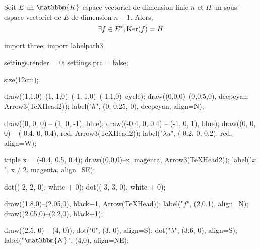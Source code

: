 \begin{prop}
	Soit $E$ un $\mathbbm{K}$-espace vectoriel de dimension finie $n$ et $H$ un sous-espace vectoriel de $E$ de dimension $n-1$. Alors, \[
		\exists f \in E^*, \operatorname{Ker}(f) = H
	\]

	\begin{center}
		\begin{asy}
			import three;
			import labelpath3;

			settings.render = 0;
			settings.prc = false;

			size(12cm);

			draw((1,1,0)--(1,-1,0)--(-1,-1,0)--(-1,1,0)--cycle);
			draw((0,0,0)--(0,0.5,0), deepcyan, Arrow3(TeXHead2));
			label("$h$", (0, 0.25, 0), deepcyan, align=N);

			draw((0, 0, 0) -- (1, 0, -1), blue);
			draw((-0.4, 0, 0.4) -- (-1, 0, 1), blue);
			draw((0, 0, 0) -- (-0.4, 0, 0.4), red, Arrow3(TeXHead2));
			label("$\lambda u$", (-0.2, 0, 0.2), red, align=W);

			triple x = (-0.4, 0.5, 0.4);
			draw((0,0,0)--x, magenta, Arrow3(TeXHead2));
			label("$x$", x / 2, magenta, align=SE);

			dot((-2, 2, 0), white + 0);
			dot((-3, 3, 0), white + 0);

			draw((1.8,0)--(2.05,0), black+1, Arrow(TeXHead));
			label("$f$", (2,0.1), align=N);
			draw((2.05,0)--(2.2,0), black+1);

			draw((2.5, 0) -- (4, 0));
			dot("$0$", (3, 0), align=S);
			dot("$\lambda$", (3.6, 0), align=S);
			label("$\mathbbm{K}$", (4,0), align=NE);
		\end{asy}
	\end{center}
\end{prop}

